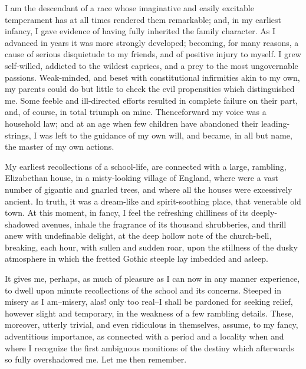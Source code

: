 \documentclass[12pt]{article}
\begin{document}
     I am the descendant of a race whose imaginative and easily
excitable temperament has at all times rendered them remarkable;
and, in my earliest infancy, I gave evidence of having fully
inherited the family character.  As I advanced in years it was more
strongly developed; becoming, for many reasons, a cause of serious
disquietude to my friends, and of positive injury to myself.  I
grew self-willed, addicted to the wildest caprices, and a prey to
the most ungovernable passions.  Weak-minded, and beset with
constitutional infirmities akin to my own, my parents could do but
little to check the evil propensities which distinguished me.  Some
feeble and ill-directed efforts resulted in complete failure on
their part, and, of course, in total triumph on mine. 
Thenceforward my voice was a household law; and at an age when few
children have abandoned their leading-strings, I was left to the
guidance of my own will, and became, in all but name, the master of
my own actions.

     My earliest recollections of a school-life, are connected with
a large, rambling, Elizabethan house, in a misty-looking village of
England, where were a vast number of gigantic and gnarled trees,
and where all the houses were excessively ancient.  In truth, it
was a dream-like and spirit-soothing place, that venerable old
town.  At this moment, in fancy, I feel the refreshing chilliness
of its deeply-shadowed avenues, inhale the fragrance of its
thousand shrubberies, and thrill anew with undefinable delight, at
the deep hollow note of the church-bell, breaking, each hour, with
sullen and sudden roar, upon the stillness of the dusky atmosphere
in which the fretted Gothic steeple lay imbedded and asleep.

     It gives me, perhaps, as much of pleasure as I can now in any
manner experience, to dwell upon minute recollections of the school
and its concerns.  Steeped in misery as I am--misery, alas! only
too real--I shall be pardoned for seeking relief, however slight
and temporary, in the weakness of a few rambling details.  These,
moreover, utterly trivial, and even ridiculous in themselves,
assume, to my fancy, adventitious importance, as connected with a
period and a locality when and where I recognize the first
ambiguous monitions of the destiny which afterwards so fully
overshadowed me.  Let me then remember.
\end{document}
